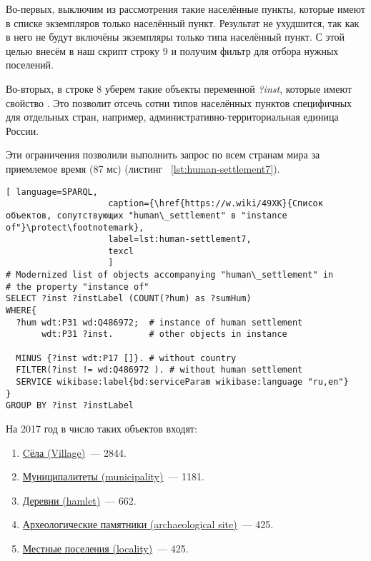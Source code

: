 Во-первых, выключим из рассмотрения такие населённые пункты, которые имеют в списке экземпляров только населённый пункт. Результат не ухудшится, так как в него не будут включёны экземпляры только типа населённый пункт. С этой целью внесём в наш скрипт строку \num{9} и получим фильтр для отбора нужных поселений.

Во-вторых, в строке \num{8} уберем такие объекты переменной \emph{?inst}, которые имеют свойство . Это позволит отсечь сотни типов населённых пунктов специфичных для отдельных стран, например, административно-территориальная единица России.

Эти ограничения позволили выполнить запрос по всем странам мира за приемлемое время (87 мс) (листинг ~\protect\ref{lst:human-settlement7}).

\lstset{numbers=left, firstnumber=1, frame=single}
\begin{lstlisting}[ language=SPARQL, 
                    caption={\href{https://w.wiki/49XK}{Cписок объектов, сопутствующих "human\_settlement" в "instance of"}\protect\footnotemark},
                    label=lst:human-settlement7,
                    texcl 
                    ]
# Modernized list of objects accompanying "human\_settlement" in 
# the property "instance of"
SELECT ?inst ?instLabel (COUNT(?hum) as ?sumHum) 
WHERE{ 
  ?hum wdt:P31 wd:Q486972;  # instance of human settlement
       wdt:P31 ?inst.       # other objects in instance
  
  MINUS {?inst wdt:P17 []}. # without country
  FILTER(?inst != wd:Q486972 ). # without human settlement
  SERVICE wikibase:label{bd:serviceParam wikibase:language "ru,en"}
}  
GROUP BY ?inst ?instLabel
\end{lstlisting}%

На 2017 год в число таких объектов входят:
\begin{enumerate} 
  \item \href{http://www.wikidata.org/entity/Q532}{Cёла (Village)}~--- \num{2844}.
  \item \href{http://www.wikidata.org/entity/Q15284}{Муниципалитеты (municipality)}~--- \num{1181}.
  \item \href{http://www.wikidata.org/entity/Q5084}{Деревни (hamlet)}~--- \num{662}.
  \item \href{http://www.wikidata.org/entity/Q839954}{Археологические памятники (archaeological site)}~--- \num{425}.
  \item \href{http://www.wikidata.org/entity/Q3257686}{Местные поселения (locality)}~--- \num{425}.
\end{enumerate}

